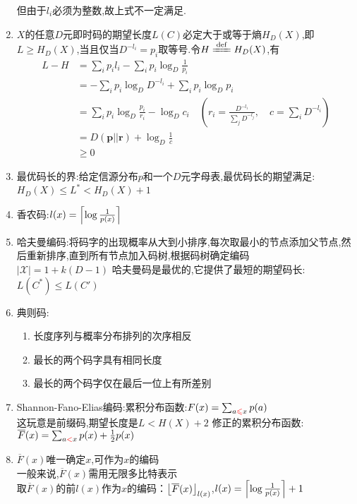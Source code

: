 \documentclass{article}
\begin{document}
\begin{enumerate}[label=(\arabic*)]
				但由于$l_i$必须为整数,故上式不一定满足.
	\item $X$的任意$D$元即时码的期望长度$L(C)$必定大于或等于熵$H_D(X)$,即\\
				$L\geq H_D(X)$,当且仅当$D^{-l_i} = p_i$取等号.令$H\defeq H_D(X)$,有
				\[
					\begin{aligned}
						L-H &= \sum_i p_i l_i - \sum_i p_i \log_D \frac{1}{p_i}\\
						&= -\sum_i p_i \log_D D^{-l_i}+\sum_i p_i \log_D p_i\\
						&= \sum_i p_i \log_D \frac{p_i}{r_i} - \log_D c_i \quad \left(r_i=\frac{D^{-l_i}}{\sum_j D^{-l_j}},\quad c=\sum_i D^{-l_i}\right)\\
						&= D(\bm{p}||\bm{r})+\log_D \frac{1}{c}\\
						&\geq 0
					\end{aligned}
				\]
	\item 最优码长的界:给定信源分布$p$和一个$D$元字母表,最优码长的期望满足:$H_D(X)\leq L^*<H_D(X)+1$
	\item 香农码:$l(x) = \left\lceil\log\frac{1}{p(x)}\right\rceil$
	\item 哈夫曼编码:将码字的出现概率从大到小排序,每次取最小的节点添加父节点,然后重新排序,直到所有节点加入码树,根据码树确定编码\\
				$|\mathcal{X}|=1+k(D-1)$
				哈夫曼码是最优的,它提供了最短的期望码长:$L(C^*)\leq L(C')$
	\item 典则码:
				\begin{enumerate}[label=(\alph*)]
					\item 长度序列与概率分布排列的次序相反
					\item 最长的两个码字具有相同长度
					\item 最长的两个码字仅在最后一位上有所差别
				\end{enumerate}
	\item Shannon-Fano-Elias编码:累积分布函数:$F(x)=\sum_{a{\color{red}\leqslant}x}p(a)$\\
				这玩意是前缀码,期望长度是$L<H(X)+2$
				修正的累积分布函数:$\overline{F}(x)=\sum_{a{\color{red} <}x}p(x)+\frac{1}{2}p(x)$
	\item $\overline{F}(x)$唯一确定$x$,可作为$x$的编码\\
				一般来说,$\overline{F}(x)$需用无限多比特表示\\
				取$\overline{F}(x)$的前$l(x)$作为$x$的编码：$\left\lfloor\overline{F}(x)\right\rfloor_{l(x)}$,\quad $l(x)=\left\lceil\log\frac{1}{p(x)}\right\rceil+1$
\end{enumerate}
\end{document}
